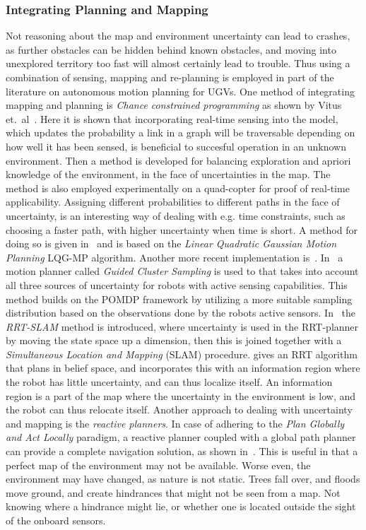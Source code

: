 \subsubsection{Integrating Planning and Mapping}
Not reasoning about the map and environment uncertainty can lead to crashes, as
further obstacles can be hidden behind known obstacles, and moving into
unexplored territory too fast will almost certainly lead to trouble. Thus using
a combination of sensing, mapping and re-planning is employed in part of the
literature on autonomous motion planning for UGVs. One method of integrating
mapping and planning is \textit{Chance constrained programming } as shown by
Vitus et.\ al~\cite{vitusHierarchicalMethodStochastic2012}. Here it is shown
that incorporating real-time sensing into the model, which updates the
probability a link in a graph will be traversable depending on how well it has
been sensed, is beneficial to succesful operation in an unknown environment.
Then a method is developed for balancing exploration and apriori knowledge of
the environment, in the face of uncertainties in the map. The method is also
employed experimentally on a quad-copter for proof of real-time applicability.
Assigning different probabilities to different paths in the face of uncertainty,
is an interesting way of dealing with e.g. time constraints, such as choosing a
faster path, with higher uncertainty when time is short. A method for doing so
is given in~\cite{vandenbergLQGMPOptimizedPath2011} and is based on the
\textit{Linear Quadratic Gaussian Motion Planning} LQG-MP algorithm. Another
more recent implementation is~\cite{blakeEfficientComputationCollision2018}.
In~\cite{kurniawatiGlobalMotionPlanning2012} a motion planner called
\textit{Guided Cluster Sampling} is used to that takes into account all three
sources of uncertainty for robots with active sensing capabilities. This method
builds on the POMDP framework by utilizing a more suitable sampling distribution
based on the observations done by the robots active sensors.
In~\cite{yifenghuangRRTSLAMMotionPlanning2008} the \textit{RRT-SLAM} method is
introduced, where uncertainty is used in the RRT-planner by moving the state
space up a dimension, then this is joined together with a \textit{Simultaneous
  Location and Mapping} (SLAM) procedure.
\cite{bryRapidlyexploringRandomBelief2011} gives an RRT algorithm that plans in
belief space, and incorporates this with an information region where the robot
has little uncertainty, and can thus localize itself. An information region is a
part of the map where the uncertainty in the environment is low, and the robot
can thus relocate itself. Another approach to dealing with uncertainty and
mapping is the \textit{reactive planners}. In case of adhering to the
\textit{Plan Globally and Act Locally} paradigm, a reactive planner coupled with
a global path planner can provide a complete navigation solution, as shown
in~\cite{djekouneSensorBasedNavigation2009}. This is useful in that a perfect
map of the environment may not be available. Worse even, the environment may
have changed, as nature is not static. Trees fall over, and floods move ground,
and create hindrances that might not be seen from a map. Not knowing where a
hindrance might lie, or whether one is located outside the sight of the onboard
sensors.


